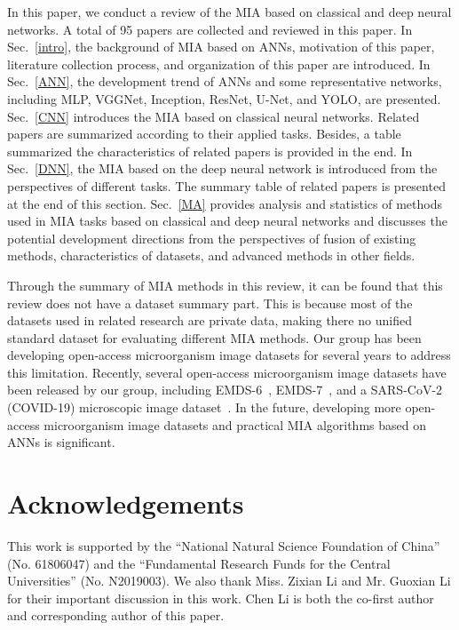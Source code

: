 In this paper, we conduct a review of the MIA based on classical and deep neural networks. A total of 95 papers are collected and reviewed in this paper. In Sec.~\ref{intro}, the background of MIA based on ANNs, motivation of this paper, literature collection process, and organization of this paper are introduced. In Sec.~\ref{ANN}, the development trend of ANNs and some representative networks, including MLP, VGGNet, Inception, ResNet, U-Net, and YOLO, are presented. Sec.~\ref{CNN} introduces the MIA based on classical neural networks. Related papers are summarized according to their applied tasks. Besides, a table summarized the characteristics of related papers is provided in the end. In Sec.~\ref{DNN}, the MIA based on the deep neural network is introduced from the perspectives of different tasks. The summary table of related papers is presented at the end of this section. Sec.~\ref{MA} provides analysis and statistics of methods used in MIA tasks based on classical and deep neural networks and discusses the potential development directions from the perspectives of fusion of existing methods, characteristics of datasets, and advanced methods in other fields.

Through the summary of MIA methods in this review, it can be found that this review does not have a dataset summary part. This is because most of the datasets used in related research are private data, making there no unified standard dataset for evaluating different MIA methods. Our group has been developing open-access microorganism image datasets for several years to address this limitation. Recently, several open-access microorganism image datasets have been released by our group, including EMDS-6~\cite{miamia-2021-EMDS6,Zhao-2022-ACSD}, EMDS-7~\cite{yang-2021-EMDS7}, and a SARS-CoV-2 (COVID-19) microscopic image dataset~\cite{Li-2020-ASMI}. In the future, developing more open-access microorganism image datasets and practical MIA algorithms based on ANNs is significant.

\section*{Acknowledgements}
This work is supported by the ``National Natural Science Foundation of China'' (No. 61806047) and the ``Fundamental Research Funds for the Central Universities'' (No. N2019003). We also thank Miss. Zixian Li and Mr. Guoxian Li for their important discussion in this work. Chen Li is both the co-first author and corresponding author of this paper.


